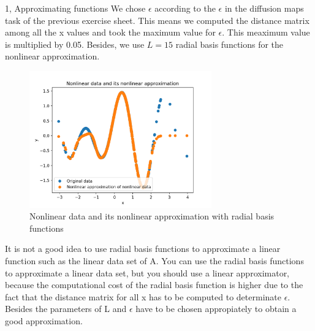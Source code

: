 \documentclass[10pt,a4paper]{article}
\begin{document}
\begin{task}{1, Approximating functions}
We chose $\epsilon$ according to the $\epsilon$ in the diffusion maps task of the previous exercise sheet. This means we computed the distance matrix among all the x values and took the maximum value for $\epsilon$. This meaximum value is multiplied by 0.05. Besides, we use $L=15$ radial basis functions for the nonlinear approximation.
\begin{figure}[H]
\centering
\includegraphics[width=0.7\textwidth]{../plots/task1_part3_eps.png}
\caption{Nonlinear data and its nonlinear approximation with radial basis functions}
\label{fig:task1_3}
\end{figure}
It is not a good idea to use radial basis functions to approximate a linear function such as the linear data set of A. You can use the radial basis functions to approximate a linear data set, but you should use a linear approximator, because the computational cost of the radial basis function is higher due to the fact that the distance matrix for all x has to be computed to determinate $\epsilon$. Besides the parameters of L and $\epsilon$ have to be chosen appropiately to obtain a good approximation.
\end{task}
\end{document}
